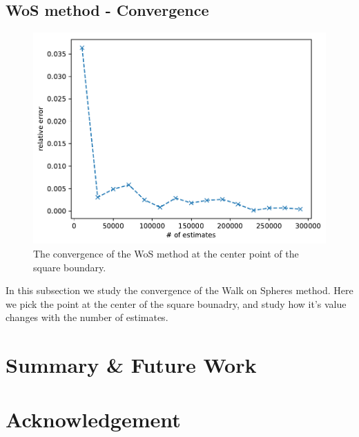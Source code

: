 \documentclass[aps, prl, reprint, groupedaddress]{revtex4-1}
\begin{document}
\subsection{WoS method - Convergence}

\begin{figure}[htbp]
    \centering
    \includegraphics[width=.4\textwidth]{./figs/err_es}
    \caption{\label{fig:err_es} The convergence of the WoS method at the center point of the square boundary.}
\end{figure}

In this subsection we study the convergence of the Walk on Spheres method. Here we pick the point at the center of the square bounadry, and study how it's value changes with the number of estimates.

\section{Summary \& Future Work}

\section{Acknowledgement}


\end{document}
